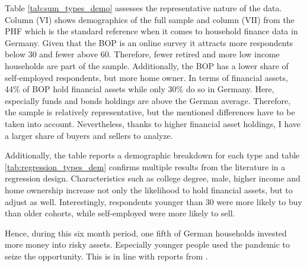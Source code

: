 \documentclass[ProjectABM]{subfiles}
\begin{document}
%



Table \ref{tab:sum_types_demo} assesses the representative nature of the data. Column (VI) shows demographics of the full sample and column (VII) from the PHF which is the standard reference when it comes to household finance data in Germany. Given that the BOP is an online survey it attracts more respondents below 30 and fewer above 60. Therefore, fewer retired and more low income households are part of the sample. Additionally, the BOP has a lower share of self-employed respondents, but more home owner. In terms of financial assets, 44\% of BOP hold financial assets while only 30\% do so in Germany. Here, especially funds and bonds holdings are above the German average. Therefore, the sample is relatively representative, but the mentioned differences have to be taken into account. Nevertheless, thanks to higher financial asset holdings, I have a larger share of buyers and sellers to analyze.

Additionally, the table reports a demographic breakdown for each type and table \ref{tab:regression_types_dem} confirms multiple results from the literature in a regression design. Characteristics such as college degree, male, higher income and home ownership increase not only the likelihood to hold financial assets, but to adjust as well. Interestingly, respondents younger than 30 were more likely to buy than older cohorts, while self-employed were more likely to sell.

Hence, during this six month period, one fifth of German households invested more money into risky assets. Especially younger people used the pandemic to seize the opportunity. This is in line with reports from \cite{DAI_2021}. %

\end{document}
